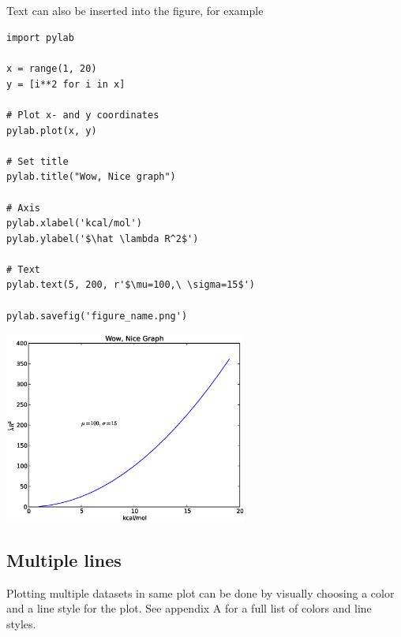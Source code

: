 \documentclass{article}
\begin{document}
\subsection*{}

Text can also be inserted into the figure, for example

\begin{multicols}{2}

\begin{lstlisting}
import pylab

x = range(1, 20)
y = [i**2 for i in x]

# Plot x- and y coordinates
pylab.plot(x, y)

# Set title
pylab.title("Wow, Nice graph")

# Axis
pylab.xlabel('kcal/mol')
pylab.ylabel('$\hat \lambda R^2$')

# Text
pylab.text(5, 200, r'$\mu=100,\ \sigma=15$')

pylab.savefig('figure_name.png')
\end{lstlisting}
\columnbreak
\includegraphics[width=0.6\textwidth]{py/figure_title_text.eps}
\end{multicols}



\newpage
\subsection{Multiple lines}

Plotting multiple datasets in same plot
can be done by visually choosing a color and
a line style for the plot.
See appendix A for a full list of
colors and line styles.
\end{document}
